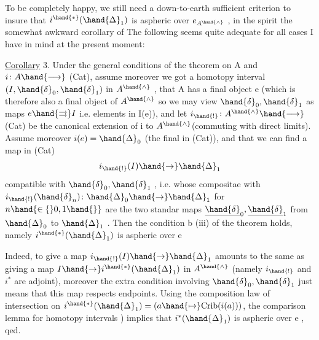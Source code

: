
To be completely happy, we still need a down-to-earth  sufficient
criterion to insure that $i^{\hand{*}}(\hand{\Delta}_1)$ is aspheric over $e_{A^{\hand{\wedge}}}$ , in the spirit 
the somewhat awkward \inserted{[deleted]} corollary of  The following seems quite
adequate for all cases I have in mind at the present moment:

\uline{Corollary} 3. Under the general conditions of the theorem on A and 
$i\colon A\hand{\longrightarrow}$ (Cat), assume moreover we got a homotopy interval $(I,\hand{\delta}_0,\hand{\delta}_1)$ in
$A^{\hand{\wedge}}$ \hand{*}, that A has a final object e (which is therefore also a final object
of $A^{\hand{\wedge}}$ so we may view $\hand{\delta}_0,\hand{\delta}_1$ as maps $e\hand{\rightrightarrows} I$ \deleted{\unsure{;}} i.e. elements in I(e)), and
let $i_{\hand{!}}\colon A^{\hand{\wedge}}\hand{\longrightarrow}$ (Cat) be the canonical extension of i to $A^{\hand{\wedge}}$(commuting with
direct limits). Assume moreover $i(e)=\hand{\Delta}_0$ (the final  in (Cat)),
and that we can find a map in (Cat)
\[ i_{\hand{!}}(I)\hand{\to}\hand{\Delta}_1 \]
compatible with $\hand{\delta}_0,\hand{\delta}_1$ , i.e. whose compositae with $i_{\hand{!}}(\hand{\delta}_n)\colon\hand{\Delta}_0\hand{\to}\hand{\Delta}_1$
for $n\hand{\in\{}0,1\hand{\}}$ are the two standar maps $\underline{\hand{\delta}}_0,\underline{\hand{\delta}}_1$ from $\hand{\Delta}_0$ to $\hand{\Delta}_1$ . Then the
condition b (iii) of the theorem holds, namely $i^{\hand{*}}(\hand{\Delta}_1)$ is aspheric over e

Indeed, to give a map $i_{\hand{!}}(I)\hand{\to}\hand{\Delta}_1$  amounts to the same as giving
a map $I\hand{\to} i^{\hand{*}}(\hand{\Delta}_1)$ in $A^{\hand{\wedge}}$ (namely $i_{\hand{!}}$ and $i^{*}$ are adjoint), moreover the extra
condition involving $\hand{\delta}_0,\hand{\delta}_1$ just means that this map respects endpoints.
Using the composition law of intersection on $i^{\hand{*}}(\hand{\Delta}_1)=(a\hand{\mapsto}\mathrm{Crib}(i(a)))$,
the comparison  lemma for homotopy intervals ) \inserted{,} implies that
$i^{*}(\hand{\Delta}_1)$ is aspheric over e , qed.

